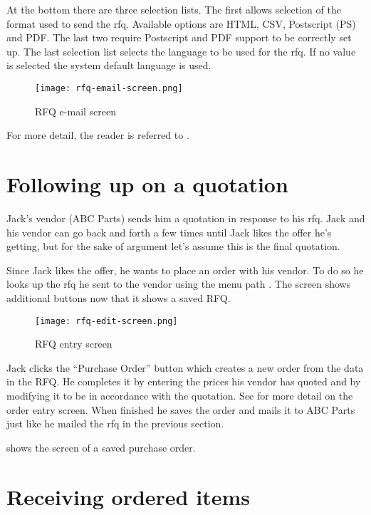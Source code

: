 At the bottom there are three selection lists. The first allows selection of the format used to send the
\gls{rfq}. Available options are HTML, CSV, Postscript (PS) and PDF. The last two require Postscript and PDF
support to be correctly set up. The last selection list selects the language to be used for the
\gls{rfq}. If no value is selected the system default language is used.

\begin{figure}[h]
\centering
\texttt{[image: rfq-email-screen.png]}
\caption{RFQ e-mail screen}
\label{fig:rfq-email-screen}
\end{figure}

For more detail, the reader is referred to .


\section{Following up on a quotation}
\label{sec-stock-quotation-followup}

Jack's vendor (ABC Parts) sends him a quotation in response to his \gls{rfq}. Jack and his vendor
can go back and forth a few times until Jack likes the offer he's getting, but for the sake of
argument let's assume this is the final quotation.

Since Jack likes the offer, he wants to place an order with his vendor. To do so he looks up the
\gls{rfq} he sent to the vendor using the menu path .
The screen shows additional buttons now that it shows a saved RFQ.


\begin{figure}[h]
\centering
\texttt{[image: rfq-edit-screen.png]}
\caption{RFQ entry screen}
\label{fig:bus-rfq-edit-screen}
\end{figure}

Jack clicks the ``Purchase Order'' button which creates a new order from the data in the RFQ.
He completes it
by entering the prices his vendor has quoted and by modifying it to be in accordance with the
quotation. See  for more
detail on the order entry screen. When finished he saves the order and mails it to
ABC Parts just like he mailed the \gls{rfq} in the previous section.

 shows the screen of a saved purchase order.

\section{Receiving ordered items}
\label{sec-stock-receiving}

